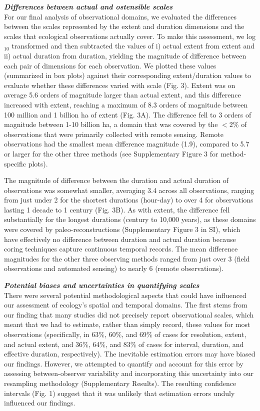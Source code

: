 \documentclass[12pt]{article}
\begin{document}
\vspace{5pt}
\noindent \textbf{\emph{Differences between actual and ostensible scales}}\\
For our final analysis of observational domains, we evaluated the differences between the scales represented by the extent and duration dimensions and the scales that ecological observations actually cover. To make this assessment, we log$_{10}$ transformed and then subtracted the values of i) actual extent from extent and ii) actual duration from duration, yielding the magnitude of difference between each pair of dimensions for each observation. We plotted these values (summarized in box plots) against their corresponding extent/duration values to evaluate whether these differences varied with scale (Fig. 3). Extent was on average 5.6 orders of magnitude larger than actual extent, and this difference increased with extent, reaching a maximum of 8.3 orders of magnitude between 100 million and 1 billion ha of extent (Fig. 3A). The difference fell to 3 orders of magnitude between 1-10 billion ha, a domain that was covered by the $<$2\% of observations that were primarily collected with remote sensing. Remote observations had the smallest mean difference magnitude (1.9), compared to 5.7 or larger for the other three methods (see Supplementary Figure 3 for method-specific plots). 


The magnitude of difference between the duration and actual duration of observations was somewhat smaller, averaging 3.4 across all observations, ranging from just under 2 for the shortest durations (hour-day) to over 4 for observations lasting 1 decade to 1 century (Fig. 3B). As with extent, the difference fell substantially for the longest durations (century to 10,000 years), as these domains were covered by paleo-reconstructions (Supplementary Figure 3 in SI), which have effectively no difference between duration and actual duration because coring techniques capture continuous temporal records. The mean difference magnitudes for the other three observing methods ranged from just over 3 (field observations and automated sensing) to nearly 6 (remote observations). 

\vspace{5pt}
\noindent \textbf{\emph{Potential biases and uncertainties in quantifying scales}}\\
There were several potential methodological aspects that could have influenced our assessment of ecology's spatial and temporal domains. The first stems from our finding that many studies did not precisely report observational scales, which meant that we had to estimate, rather than simply record, these values for most observations (specifically, in 63\%, 60\%, and 69\% of cases for resolution, extent, and actual extent, and 36\%, 64\%, and 83\% of cases for interval, duration, and effective duration, respectively). The inevitable estimation errors may have biased our findings. However, we attempted to quantify and account for this error by assessing between-observer variability and incorporating this uncertainty into our resampling methodology (Supplementary Results). The resulting confidence intervals (Fig. 1) suggest that it was unlikely that estimation errors unduly influenced our findings. 
\end{document}
